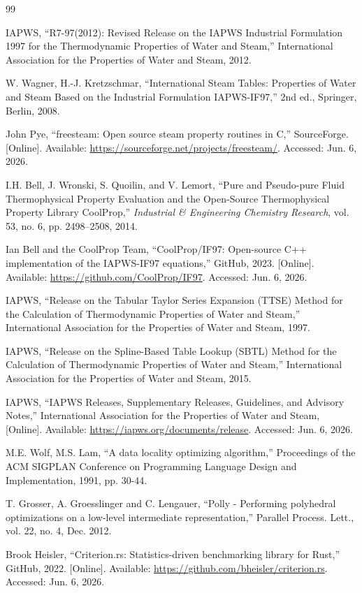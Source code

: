 \documentclass{article}
\begin{document}
\begin{thebibliography}{99}

IAPWS, ``R7-97(2012): Revised Release on the IAPWS Industrial Formulation 1997 for the Thermodynamic Properties of Water and Steam,'' International Association for the Properties of Water and Steam, 2012.

W. Wagner, H.-J. Kretzschmar, ``International Steam Tables: Properties of Water and Steam Based on the Industrial Formulation IAPWS-IF97,'' 2nd ed., Springer, Berlin, 2008.

John Pye, ``freesteam: Open source steam property routines in C,'' SourceForge. [Online]. Available: \url{https://sourceforge.net/projects/freesteam/}. Accessed: Jun. 6, 2026.

I.H. Bell, J. Wronski, S. Quoilin, and V. Lemort, ``Pure and Pseudo-pure Fluid Thermophysical Property Evaluation and the Open-Source Thermophysical Property Library CoolProp,'' \textit{Industrial \& Engineering Chemistry Research}, vol. 53, no. 6, pp. 2498--2508, 2014.

Ian Bell and the CoolProp Team, ``CoolProp/IF97: Open-source C++ implementation of the IAPWS-IF97 equations,'' GitHub, 2023. [Online]. Available: \url{https://github.com/CoolProp/IF97}. Accessed: Jun. 6, 2026.

IAPWS, ``Release on the Tabular Taylor Series Expansion (TTSE) Method for the Calculation of Thermodynamic Properties of Water and Steam,'' International Association for the Properties of Water and Steam, 1997.

IAPWS, ``Release on the Spline-Based Table Lookup (SBTL) Method for the Calculation of Thermodynamic Properties of Water and Steam,'' International Association for the Properties of Water and Steam, 2015.

IAPWS, ``IAPWS Releases, Supplementary Releases, Guidelines, and Advisory Notes,'' International Association for the Properties of Water and Steam, [Online]. Available: \url{https://iapws.org/documents/release}. Accessed: Jun. 6, 2026.

M.E. Wolf, M.S. Lam, ``A data locality optimizing algorithm,'' Proceedings of the ACM SIGPLAN Conference on Programming Language Design and Implementation, 1991, pp. 30-44.

T. Grosser, A. Groesslinger and C. Lengauer, ``Polly - Performing polyhedral optimizations on a low-level intermediate representation,'' Parallel Process. Lett., vol. 22, no. 4, Dec. 2012.

Brook Heisler, ``Criterion.rs: Statistics-driven benchmarking library for Rust,'' GitHub, 2022. [Online]. Available: \url{https://github.com/bheisler/criterion.rs}. Accessed: Jun. 6, 2026.

\end{thebibliography}
\end{document}

